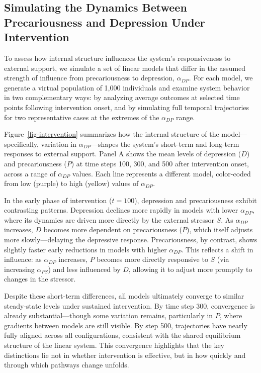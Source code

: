 \documentclass[
]{article}
\begin{document}
\subsection{Simulating the Dynamics Between Precariousness and
Depression Under
Intervention}\label{simulating-the-dynamics-between-precariousness-and-depression-under-intervention}

To assess how internal structure influences the system's responsiveness
to external support, we simulate a set of linear models that differ in
the assumed strength of influence from precariousness to depression,
\(\alpha_{DP}\). For each model, we generate a virtual population of
1,000 individuals and examine system behavior in two complementary ways:
by analyzing average outcomes at selected time points following
intervention onset, and by simulating full temporal trajectories for two
representative cases at the extremes of the \(\alpha_{DP}\) range.

Figure~\ref{fig-intervention} summarizes how the internal structure of
the model---specifically, variation in \(\alpha_{DP}\)---shapes the
system's short-term and long-term responses to external support. Panel A
shows the mean levels of depression (\(D\)) and precariousness (\(P\))
at time steps 100, 300, and 500 after intervention onset, across a range
of \(\alpha_{DP}\) values. Each line represents a different model,
color-coded from low (purple) to high (yellow) values of
\(\alpha_{DP}\).

In the early phase of intervention (\(t = 100\)), depression and
precariousness exhibit contrasting patterns. Depression declines more
rapidly in models with lower \(\alpha_{DP}\), where its dynamics are
driven more directly by the external stressor \(S\). As \(\alpha_{DP}\)
increases, \(D\) becomes more dependent on precariousness (\(P\)), which
itself adjusts more slowly---delaying the depressive response.
Precariousness, by contrast, shows slightly faster early reductions in
models with higher \(\alpha_{DP}\). This reflects a shift in influence:
as \(\alpha_{DP}\) increases, \(P\) becomes more directly responsive to
\(S\) (via increasing \(\alpha_{PS}\)) and less influenced by \(D\),
allowing it to adjust more promptly to changes in the stressor.

Despite these short-term differences, all models ultimately converge to
similar steady-state levels under sustained intervention. By time step
300, convergence is already substantial---though some variation remains,
particularly in \(P\), where gradients between models are still visible.
By step 500, trajectories have nearly fully aligned across all
configurations, consistent with the shared equilibrium structure of the
linear system. This convergence highlights that the key distinctions lie
not in whether intervention is effective, but in how quickly and through
which pathways change unfolds.
\end{document}
